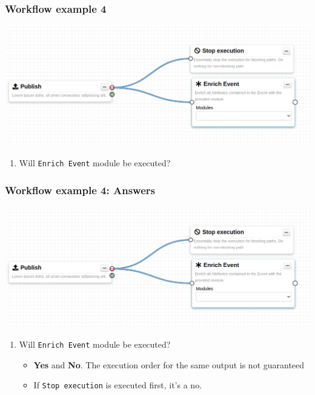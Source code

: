 \begin{frame}
    \frametitle{Workflow example 4}
    \begin{center}
        \includegraphics[width=0.9\linewidth]{pictures/example-4.png}
    \end{center}
    \begin{enumerate}
        \item Will \texttt{Enrich Event} module be executed?
    \end{enumerate}
\end{frame}


\begin{frame}
    \frametitle{Workflow example 4: Answers}
    \begin{center}
        \includegraphics[width=0.9\linewidth]{pictures/example-4.png}
    \end{center}
    \begin{enumerate}
        \item Will \texttt{Enrich Event} module be executed?
        \begin{itemize}
            \item \textbf{Yes} and \textbf{No}. The execution order for the same output is not guaranteed
            \item If \texttt{Stop execution} is executed first, it's a no.
        \end{itemize}
    \end{enumerate}
\end{frame}

